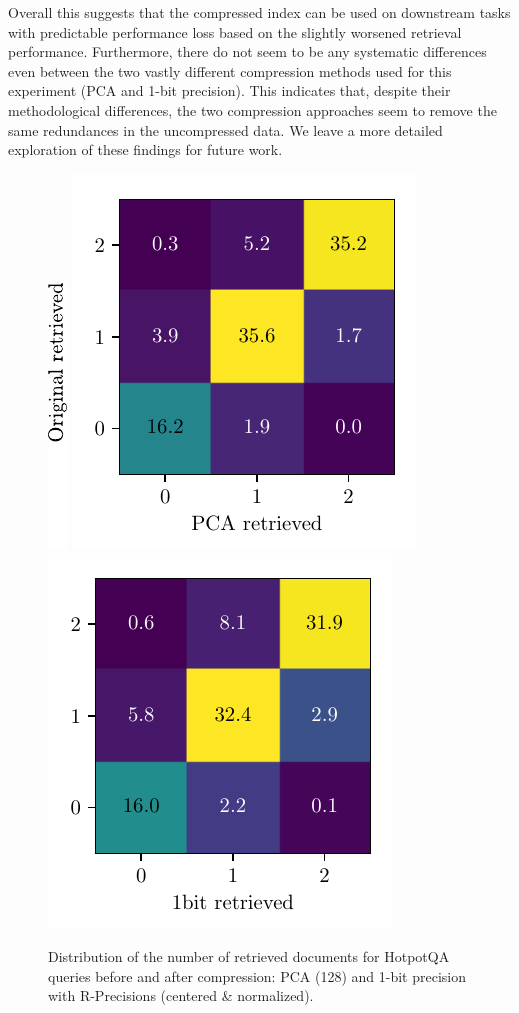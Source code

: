 Overall this suggests that the compressed index can be used on downstream tasks with predictable performance loss based on the slightly worsened retrieval performance.
Furthermore, there do not seem to be any systematic differences even between the two vastly different compression methods used for this experiment (PCA and 1-bit precision).
This indicates that, despite their methodological differences, the two compression approaches seem to remove the same redundances in the uncompressed data.
We leave a more detailed exploration of these findings for future work.

\begin{figure}[ht]
    \center
    \includegraphics[width=0.02\linewidth]{img/hits_label.pdf}
    \hspace{-0.2cm}
    \includegraphics[width=0.35\linewidth]{img/hits_pca.pdf}
    \hspace{-0.39cm}
    \includegraphics[width=0.35\linewidth]{img/hits_1bit.pdf}
    \caption{Distribution of the number of retrieved documents for HotpotQA queries before and after compression: PCA (128) and 1-bit precision with R-Precisions (centered \& normalized).}
    \label{fig:hits}
\end{figure}

